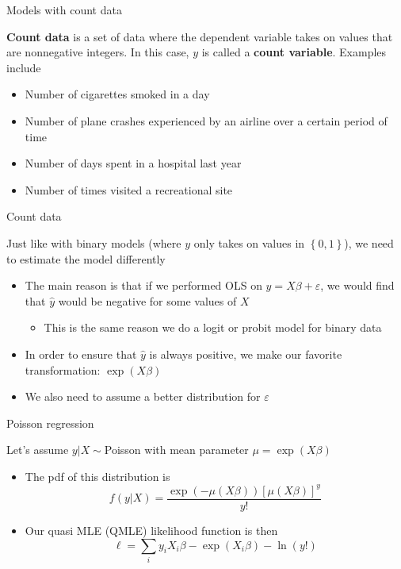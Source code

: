 \documentclass[english,xcolor=dvipsnames]{beamer}
\begin{document}
\begin{frame}{Models with count data}

\textbf{Count data} is a set of data where the dependent variable
takes on values that are nonnegative integers. In this case, $y$
is called a \textbf{count variable}. Examples include
\begin{itemize}
\item Number of cigarettes smoked in a day
\item Number of plane crashes experienced by an airline over a certain period
of time
\item Number of days spent in a hospital last year
\item Number of times visited a recreational site
\end{itemize}

\end{frame}


\begin{frame}{Count data}

Just like with binary models (where $y$ only takes on values in $\left\{ 0,1\right\} $),
we need to estimate the model differently
\begin{itemize}
\item The main reason is that if we performed OLS on $y=X\beta+\varepsilon$,
we would find that $\hat{y}$ would be negative for some values of
$X$

\begin{itemize}
\item This is the same reason we do a logit or probit model for binary data
\end{itemize}
\item In order to ensure that $\hat{y}$ is always positive, we make our
favorite transformation: $\exp\left(X\beta\right)$
\item We also need to assume a better distribution for $\varepsilon$
\end{itemize}

\end{frame}


\begin{frame}{Poisson regression}

Let's assume $y\vert X\sim$Poisson with mean parameter $\mu=\exp\left(X\beta\right)$
\begin{itemize}
\item The pdf of this distribution is
\[
f\left(y\vert X\right)=\frac{\exp\left(-\mu\left(X\beta\right)\right)\left[\mu\left(X\beta\right)\right]^{y}}{y!}
\]

\item Our quasi MLE (QMLE) likelihood function is then
\[
\ell=\sum_{i}y_{i}X_{i}\beta-\exp\left(X_{i}\beta\right)-\ln\left(y!\right)
\]

\end{itemize}

\end{frame}
\end{document}
